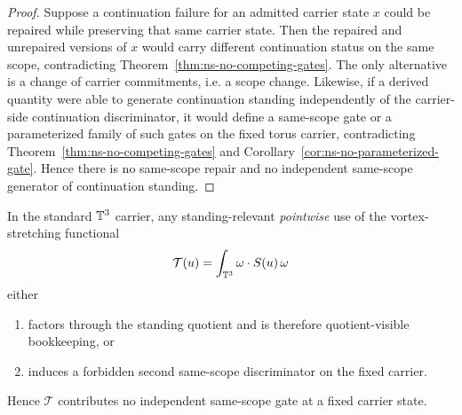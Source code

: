 \begin{proof}
Suppose a continuation failure for an admitted carrier state $x$ could be repaired while preserving
that same carrier state. Then the repaired and unrepaired versions of $x$ would carry different
continuation status on the same scope, contradicting Theorem~\ref{thm:ns-no-competing-gates}. The
only alternative is a change of carrier commitments, i.e. a scope change. Likewise, if a derived
quantity were able to generate continuation standing independently of the carrier-side continuation
discriminator, it would define a same-scope gate or a parameterized family of such gates on the
fixed torus carrier, contradicting Theorem~\ref{thm:ns-no-competing-gates} and
Corollary~\ref{cor:ns-no-parameterized-gate}. Hence there is no same-scope repair and no independent
same-scope generator of continuation standing.
\end{proof}

\begin{lemma}\label{prop:stretching-internal}
In the standard $\mathbb{T}^3$ carrier, any standing-relevant \emph{pointwise} use of the vortex-stretching functional
\[
\mathcal T(u)=\int_{\mathbb{T}^3}\omega\cdot S(u)\,\omega
\]
either
\begin{enumerate}[label=(\roman*), leftmargin=2.2em]
\item factors through the standing quotient and is therefore quotient-visible bookkeeping, or
\item induces a forbidden second same-scope discriminator on the fixed carrier.
\end{enumerate}
Hence $\mathcal T$ contributes no independent same-scope gate at a fixed carrier state.
\end{lemma}

